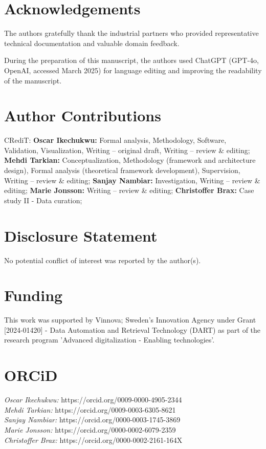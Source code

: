 \documentclass[largeformat]{interact}
\begin{document}
\section*{Acknowledgements}
The authors gratefully thank the industrial partners who provided representative technical documentation and valuable domain feedback.

\noindent During the preparation of this manuscript, the authors used ChatGPT (GPT-4o, OpenAI, accessed March 2025) for language editing and improving the readability of the manuscript.
\section*{Author Contributions}
CRediT: \textbf{Oscar Ikechukwu:} Formal analysis, Methodology, Software, Validation, Visualization, Writing -- original draft, Writing -- review \& editing; \textbf{Mehdi Tarkian:} Conceptualization, Methodology (framework and architecture design), Formal analysis (theoretical framework development), Supervision, Writing -- review \& editing; \textbf{Sanjay Nambiar:} Investigation, Writing -- review \& editing; \textbf{Marie Jonsson:} Writing -- review \& editing; \textbf{Christoffer Brax:} Case study II - Data curation;

\section*{Disclosure Statement}
No potential conflict of interest was reported by the author(s).
\section*{Funding}
\noindent This work was supported by Vinnova; Sweden's Innovation Agency under Grant [2024-01420] - Data Automation and Retrieval Technology (DART) as part of the research program 'Advanced digitalization - Enabling technologies'.
\section*{ORCiD}
\textit{Oscar Ikechukwu:}   https://orcid.org/0009-0000-4905-2344\\
\textit{Mehdi Tarkian:}   https://orcid.org/0009-0003-6305-8621\\
\textit{Sanjay Nambiar:}   https://orcid.org/0000-0003-1745-3869\\
\textit{Marie Jonsson:}  https://orcid.org/0000-0002-6079-2359\\
\textit{Christoffer Brax:}  https://orcid.org/0000-0002-2161-164X
\end{document}
